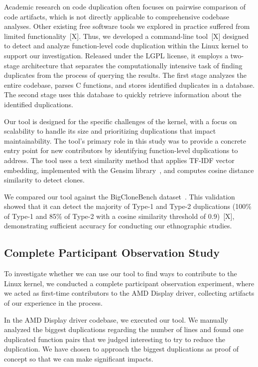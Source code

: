 \documentclass[10pt,conference]{IEEEtran}
\begin{document}
Academic research on code duplication often focuses on pairwise comparison of code artifacts, which is not directly applicable to comprehensive codebase analyses. Other existing free software tools we explored in practice suffered from limited functionality~[X].
Thus, we developed a command-line tool~[X] designed to detect and analyze function-level code duplication within the Linux kernel to support our investigation. 
Released under the LGPL license, it employs a two-stage architecture that separates the computationally intensive task of finding duplicates from the process of querying the results. The first stage analyzes the entire codebase, parses C functions, and stores identified duplicates in a database. The second stage uses this database to quickly retrieve information about the identified duplications.

Our tool is designed for the specific challenges of the kernel, with a focus on scalability to handle its size and prioritizing duplications that impact maintainability. 
The tool's primary role in this study was to provide a concrete entry point for new contributors by identifying function-level duplications to address. The tool uses a text similarity method that applies TF-IDF vector embedding, implemented with the Gensim library~\cite{gensim}, and computes cosine distance similarity to detect clones. 

We compared our tool against the BigCloneBench dataset~\cite{bigclonebench}. This validation showed that it can detect the majority of Type-1 and Type-2 duplications (100\% of Type-1 and 85\% of Type-2 with a cosine similarity threshold of 0.9)~[X], demonstrating sufficient accuracy for conducting our ethnographic studies.

\subsection{Complete Participant Observation Study}
\label{sec:participant}

To investigate whether we can use our tool to find ways to contribute to the Linux kernel, we conducted a complete participant observation experiment, where we acted as first-time contributors to the AMD Display driver, collecting artifacts of our experience in the process.

In the AMD Display driver codebase, we executed our tool. We manually analyzed the biggest duplications regarding the number of lines and found one duplicated function pairs that we judged interesting to try to reduce the duplication. We have chosen to approach the biggest duplications as proof of concept so that we can make significant impacts. 
\end{document}

